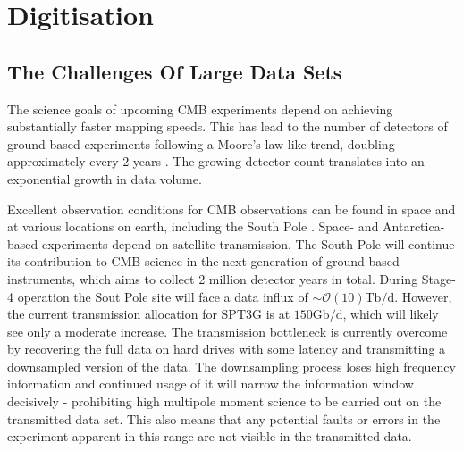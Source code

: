 \documentclass[apj]{emulateapj}
\begin{document}






\section{Digitisation}
\label{sec:dig}

\subsection{The Challenges Of Large Data Sets}
\label{subsec:problem}


The science goals of upcoming CMB experiments depend on achieving substantially faster mapping speeds. This has lead to the number of detectors of ground-based experiments following a Moore's law like trend, doubling approximately every 2 years \citep{s4sciencebook, Abazajian2015}. The growing detector count translates into an exponential growth in data volume.

Excellent observation conditions for CMB observations can be found in space and at various locations on earth, including the South Pole \citep{kovac2007}. Space- and Antarctica-based experiments depend on satellite transmission. The South Pole will continue its contribution to CMB science in the next generation of ground-based instruments, which aims to collect 2 million detector years in total. During Stage-4 operation the Sout Pole site will face a data influx of $\sim \mathcal{O}(10)\mathrm{Tb/d}$. However, the current transmission allocation for SPT3G is at $150\mathrm{Gb/d}$, which will likely see only a moderate increase. The transmission bottleneck is currently overcome by recovering the full data on hard drives with some latency and transmitting a downsampled version of the data. The downsampling process loses high frequency information and continued usage of it will narrow the information window decisively - prohibiting high multipole moment science to be carried out on the transmitted data set. This also means that any potential faults or errors in the experiment apparent in this range are not visible in the transmitted data. %
\end{document}
